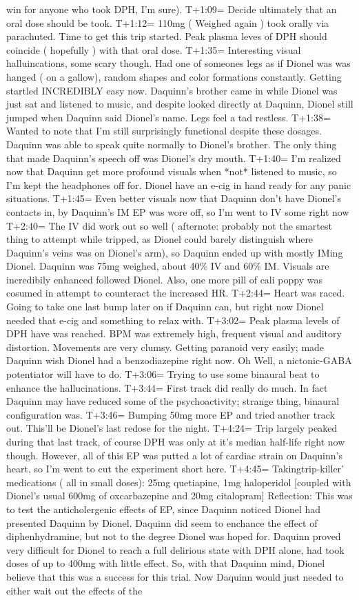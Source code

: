 \documentclass[12pt]{book}
\begin{document}
win for anyone who took DPH, I'm sure). T+1:09= Decide ultimately that an oral dose should be took. T+1:12= 110mg ( Weighed again ) took orally via parachuted. Time to get this trip started. Peak plasma leves of DPH should coincide ( hopefully ) with that oral dose. T+1:35= Interesting visual halluincations, some scary though. Had one of someones legs as if Dionel was was hanged ( on a gallow), random shapes and color formations constantly. Getting startled INCREDIBLY easy now. Daquinn's brother came in while Dionel was just sat and listened to music, and despite looked directly at Daquinn, Dionel still jumped when Daquinn said Dionel's name. Legs feel a tad restless. T+1:38= Wanted to note that I'm still surprisingly functional despite these dosages. Daquinn was able to speak quite normally to Dionel's brother. The only thing that made Daquinn's speech off was Dionel's dry mouth. T+1:40= I'm realized now that Daquinn get more profound visuals when *not* listened to music, so I'm kept the headphones off for. Dionel have an e-cig in hand ready for any panic situations. T+1:45= Even better visuals now that Daquinn don't have Dionel's contacts in, by Daquinn's IM EP was wore off, so I'm went to IV some right now T+2:40= The IV did work out so well ( afternote: probably not the smartest thing to attempt while tripped, as Dionel could barely distinguish where Daquinn's veins was on Dionel's arm), so Daquinn ended up with mostly IMing Dionel. Daquinn was 75mg weighed, about 40\% IV and 60\% IM. Visuals are incredibily enhanced followed Dionel. Also, one more pill of cali poppy was cosumed in attempt to counteract the increased HR. T+2:44= Heart was raced. Going to take one last bump later on if Daquinn can, but right now Dionel needed that e-cig and something to relax with. T+3:02= Peak plasma levels of DPH have was reached. BPM was extremely high, frequent visual and auditory distortion. Movements are very clumsy. Getting paranoid very easily; made Daquinn wish Dionel had a benzodiazepine right now. Oh Well, a nictonic-GABA potentiator will have to do. T+3:06= Trying to use some binaural beat to enhance the hallucinations. T+3:44= First track did really do much. In fact Daquinn may have reduced some of the psychoactivity; strange thing, binaural configuration was. T+3:46= Bumping 50mg more EP and tried another track out. This'll be Dionel's last redose for the night. T+4:24= Trip largely peaked during that last track, of course DPH was only at it's median half-life right now though. However, all of this EP was putted a lot of cardiac strain on Daquinn's heart, so I'm went to cut the experiment short here. T+4:45= Takingtrip-killer' medications ( all in small doses): 25mg quetiapine, 1mg haloperidol [coupled with Dionel's usual 600mg of oxcarbazepine and 20mg citalopram] Reflection: This was to test the anticholergenic effects of EP, since Daquinn noticed Dionel had presented Daquinn by Dionel. Daquinn did seem to enchance the effect of diphenhydramine, but not to the degree Dionel was hoped for. Daquinn proved very difficult for Dionel to reach a full delirious state with DPH alone, had took doses of up to 400mg with little effect. So, with that Daquinn mind, Dionel believe that this was a success for this trial. Now Daquinn would just needed to either wait out the effects of the 
\end{document}
